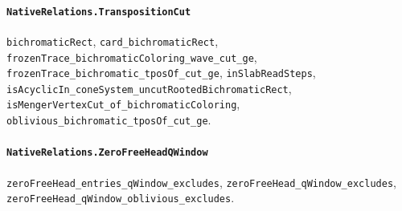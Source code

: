 \paragraph{\texttt{NativeRelations.TranspositionCut}}
{\small\raggedright \texttt{bichromaticRect}, \texttt{card\_bichromaticRect}, \texttt{frozenTrace\_bichromaticColoring\_wave\_cut\_ge}, \texttt{frozenTrace\_bichromatic\_tposOf\_cut\_ge}, \texttt{inSlabReadSteps}, \texttt{isAcyclicIn\_coneSystem\_uncutRootedBichromaticRect}, \texttt{isMengerVertexCut\_of\_bichromaticColoring}, \texttt{oblivious\_bichromatic\_tposOf\_cut\_ge}.\par}

\paragraph{\texttt{NativeRelations.ZeroFreeHeadQWindow}}
{\small\raggedright \texttt{zeroFreeHead\_entries\_qWindow\_excludes}, \texttt{zeroFreeHead\_qWindow\_excludes}, \texttt{zeroFreeHead\_qWindow\_oblivious\_excludes}.\par}
